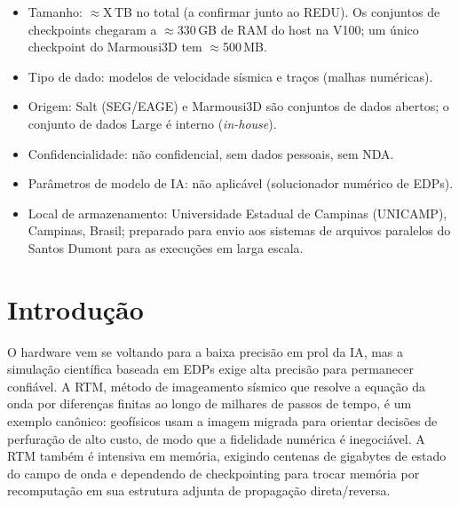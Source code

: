 \documentclass[12pt,a4paper]{article}
\begin{document}
\begin{itemize}
  \item Tamanho: $\approx$X\,TB no total (a confirmar junto ao REDU). Os
        conjuntos de checkpoints chegaram a $\approx$330\,GB de RAM do host na
        V100; um único checkpoint do Marmousi3D tem $\approx$500\,MB.
  \item Tipo de dado: modelos de velocidade sísmica e traços (malhas
        numéricas).
  \item Origem: Salt (SEG/EAGE) e Marmousi3D são conjuntos de dados abertos; o
        conjunto de dados Large é interno (\emph{in-house}).
  \item Confidencialidade: não confidencial, sem dados pessoais, sem NDA.
  \item Parâmetros de modelo de IA: não aplicável (solucionador numérico de
        EDPs).
  \item Local de armazenamento: Universidade Estadual de Campinas (UNICAMP),
        Campinas, Brasil; preparado para envio aos sistemas de arquivos
        paralelos do Santos Dumont para as execuções em larga escala.
\end{itemize}

\fi

\iffalse

\section{Introdução}

O hardware vem se voltando para a baixa precisão em prol da IA, mas a
simulação científica baseada em EDPs exige alta precisão para permanecer
confiável. A RTM, método de imageamento sísmico que resolve a equação da onda
por diferenças finitas ao longo de milhares de passos de tempo, é um exemplo
canônico: geofísicos usam a imagem migrada para orientar decisões de
perfuração de alto custo, de modo que a fidelidade numérica é inegociável. A
RTM também é intensiva em memória, exigindo centenas de gigabytes de estado do
campo de onda e dependendo de checkpointing para trocar memória por
recomputação em sua estrutura adjunta de propagação direta/reversa.
\end{document}
